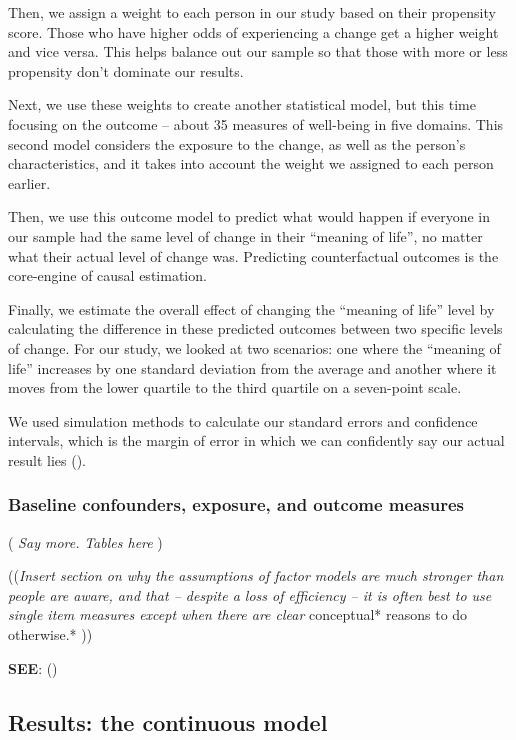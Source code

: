 \documentclass[
  singlecolumn,
  9pt]{scrartcl}
\begin{document}
Then, we assign a weight to each person in our study based on their
propensity score. Those who have higher odds of experiencing a change
get a higher weight and vice versa. This helps balance out our sample so
that those with more or less propensity don't dominate our results.

Next, we use these weights to create another statistical model, but this
time focusing on the outcome -- about 35 measures of well-being in five
domains. This second model considers the exposure to the change, as well
as the person's characteristics, and it takes into account the weight we
assigned to each person earlier.

Then, we use this outcome model to predict what would happen if everyone
in our sample had the same level of change in their ``meaning of life'',
no matter what their actual level of change was. Predicting
counterfactual outcomes is the core-engine of causal estimation.

Finally, we estimate the overall effect of changing the ``meaning of
life'' level by calculating the difference in these predicted outcomes
between two specific levels of change. For our study, we looked at two
scenarios: one where the ``meaning of life'' increases by one standard
deviation from the average and another where it moves from the lower
quartile to the third quartile on a seven-point scale.

We used simulation methods to calculate our standard errors and
confidence intervals, which is the margin of error in which we can
confidently say our actual result lies
().

\subsubsection{Baseline confounders, exposure, and outcome
measures}\label{baseline-confounders-exposure-and-outcome-measures}

( \emph{Say more.} \emph{Tables here} )

((\emph{Insert section on why the assumptions of factor models are much
stronger than people are aware, and that -- despite a loss of efficiency
-- it is often best to use single item measures except when there are
clear} conceptual* reasons to do otherwise.* ))

\textbf{SEE}: ()

\subsection{Results: the continuous
model}\label{results-the-continuous-model}
\end{document}
